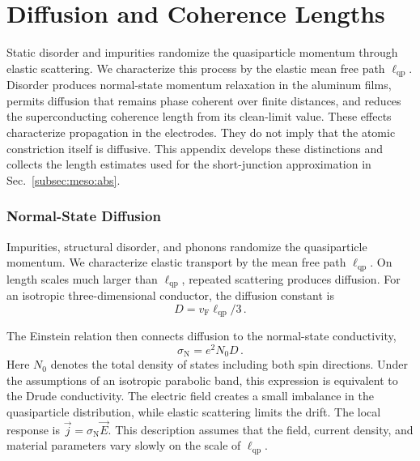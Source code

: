 
\chapter{Diffusion and Coherence Lengths}
\label{app:theory:diffusive-transport}

    Static disorder and impurities randomize the quasiparticle momentum through elastic scattering. We characterize this process by the elastic mean free path \(\ell_\mathrm{qp}\). Disorder produces normal-state momentum relaxation in the aluminum films, permits diffusion that remains phase coherent over finite distances, and reduces the superconducting coherence length from its clean-limit value. These effects characterize propagation in the electrodes. They do not imply that the atomic constriction itself is diffusive. This appendix develops these distinctions and collects the length estimates used for the short-junction approximation in Sec.~\ref{subsec:meso:abs}.

    \subsection*{Normal-State Diffusion}

        Impurities, structural disorder, and phonons randomize the quasiparticle momentum. We characterize elastic transport by the mean free path $\ell_\mathrm{qp}$. On length scales much larger than $\ell_\mathrm{qp}$, repeated scattering produces diffusion. For an isotropic three-dimensional conductor, the diffusion constant is
        \begin{equation}
            D = v_\mathrm{F}\ell_\mathrm{qp}/3\,.
        \end{equation}

        The Einstein relation then connects diffusion to the normal-state conductivity,
        \begin{equation}
            \sigma_\mathrm{N} = e^2 N_0 D\,.
        \end{equation}
        Here $N_0$ denotes the total density of states including both spin directions.
        Under the assumptions of an isotropic parabolic band, this expression is equivalent to the Drude conductivity. The electric field creates a small imbalance in the quasiparticle distribution, while elastic scattering limits the drift. The local response is $\vec{j}=\sigma_\mathrm{N}\vec{E}$. This description assumes that the field, current density, and material parameters vary slowly on the scale of $\ell_\mathrm{qp}$. \cite{drude_zur_1900,gross_festkorperphysik_2014}

